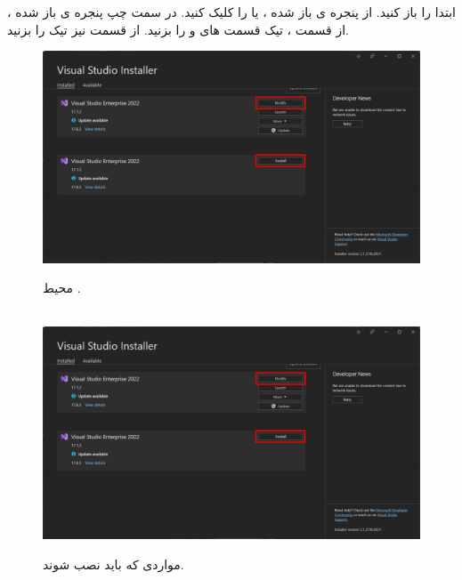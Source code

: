     {\large
    ابتدا  را باز کنید. از پنجره ی باز شده ،  یا  را کلیک کنید. در سمت چپ پنجره ی باز شده ، از قسمت  ، تیک قسمت های  و  را بزنید.
    از قسمت  نیز تیک  را بزنید.
    }
    \begin{figure}[H]
        \centering
        \setlength{\belowcaptionskip}{-10pt}
        \includegraphics[width=\textwidth]{Images/1.Intro.2.1.png}
        \caption{محیط .}
        \\[20pt]
        \includegraphics[width=\textwidth]{Images/1.Intro.2.1.png}
        \caption{مواردی که باید نصب شوند.}
    \end{figure}

